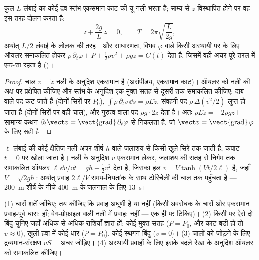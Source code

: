 \begin{proposition}[एक अस्थायी प्रवाह: यू-नली]\label{prop:b2:euler-bernoulli:utube}
कुल $L$ लंबाई का कोई द्रव-स्तंभ एकसमान काट की यू-नली भरता है;
साम्य से $z$ विस्थापित होने पर वह इस तरह दोलन करता है:
\[
\ddot z + \frac{2g}{L}\,z = 0 , \qquad T = 2\pi\sqrt{\frac{L}{2g}} ,
\]
अर्थात् $L/2$ लंबाई के लोलक की तरह। और साधारणतः, विभव $\varphi$ वाले
किसी अस्थायी पर  के लिए ऑयलर समाकलित होकर
$\rho\,\partial_t\varphi + P + \tfrac12\rho v^2 + \rho gz = C(t)$ देता है, जिसमें
वही अचर पूरे तरल में एक-सा रहता है ()।
\end{proposition}

\begin{proof}
चाल $v = \dot z$ नली के अनुदिश एकसमान है (असंपीड्य,
एकसमान काट)। ऑयलर को नली की अक्ष पर प्रक्षेपित कीजिए और स्तंभ के
अनुदिश एक मुक्त सतह से दूसरी तक समाकलित कीजिए: दाब वाले पद
कट जाते हैं (दोनों सिरों पर $P_0$), $\int\rho\,\partial_tv\,\dd s = \rho L\ddot z$,
संवहनी पद $\rho\,\Delta(v^2/2)$ लुप्त हो जाता है (दोनों सिरों पर वही चाल),
और गुरुत्व वाला पद $\rho g\cdot2z$ देता है। अतः $\rho L\ddot z = -2\rho gz$।
सामान्य कथन $\partial_t\vect v = \operatorname{\vect{grad}}
\partial_t\varphi$ से निकलता है, जो $\vect v = \operatorname{\vect{grad}}\varphi$ के लिए सही है।
\end{proof}

\begin{example}[नली चालू करना]\label{ex:b2:euler-bernoulli:start}
$\ell$ लंबाई की कोई क्षैतिज नली अचर शीर्ष $h$ वाले जलाशय से किसी खुले
सिरे तक जाती है; कपाट $t = 0$ पर खोला जाता है। नली के अनुदिश $v$
एकसमान लेकर, जलाशय की सतह से निर्गम तक समाकलित ऑयलर
$\ell\,\dd v/\dd t = gh - \tfrac12v^2$ देता है, जिसका हल
$v = V\tanh(Vt/2\ell)$ है, जहाँ $V = \sqrt{2gh}$: अर्थात् प्रवाह $2\ell/V$
समय-नियतांक के साथ टोरिचेली की चाल तक पहुँचता है --- \qty{200}{m} शीर्ष
के नीचे \qty{400}{m} के जलनाल के लिए \qty{13}{s}।
\end{example}

\begin{method}[बर्नूली का प्रयोग]\label{met:b2:euler-bernoulli:method}
(1) चारों शर्तें जाँचिए; तय कीजिए कि प्रवाह अघूर्णी है या नहीं
(किसी अवरोधक के चारों ओर एकसमान प्रवाह-पूर्व धारा: हाँ; वेग-प्रोफ़ाइल
वाली नली में प्रवाह: नहीं --- एक ही  पर टिकिए)। (2) किसी
 पर ऐसे दो बिंदु चुनिए जहाँ अधिक से अधिक राशियाँ ज्ञात हों: कोई मुक्त
सतह ($P = P_0$, और काट बड़ी हो तो $v \approx 0$), खुली हवा में कोई
धार ($P = P_0$), कोई स्थगन बिंदु ($v = 0$)। (3) चालों को जोड़ने के लिए
द्रव्यमान-संरक्षण $vS = \text{अचर}$ जोड़िए। (4) अस्थायी
प्रवाहों के लिए इसके बदले रेखा के अनुदिश ऑयलर को समाकलित कीजिए।
\end{method}

